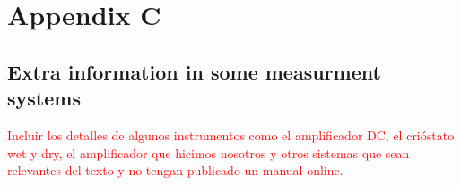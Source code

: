 \chapter{Appendix C}
\label{appendixc}

\section{Extra information in some measurment systems}

\textcolor{red}{Incluir los detalles de algunos instrumentos como el amplificador DC, el crióstato wet y dry, el amplificador que hicimos nosotros y otros sistemas que sean relevantes del texto y no tengan publicado un manual online.}